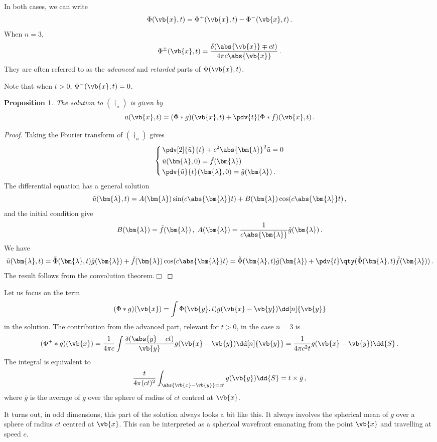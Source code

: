 \documentclass{article}
\theoremstyle{plain}\theoremheaderfont{\normalfont\itshape}\theorembodyfont{\rmfamily}\theoremseparator{.}\newtheorem*{rem}{Remark}\newtheorem*{ex}{Example}\newtheorem*{proof}{Proof}\newtheorem*{altp}{Alternative proof}
\theoremstyle{plain}\theoremheaderfont{\normalfont\bfseries}\theorembodyfont{\rmfamily}\theoremseparator{.}\newtheorem{thm}{Theorem}[section]\newtheorem{lem}[thm]{Lemma}\newtheorem{prop}[thm]{Proposition}\newtheorem*{cor}{Corollary}\newtheorem{defn}[thm]{Definition}\newtheorem{clm}[thm]{Claim}\newtheorem{clminproof}{Claim}
\theoremstyle{break}\theoremheaderfont{\normalfont\itshape}\theorembodyfont{\rmfamily}\theoremseparator{.\medskip}\newtheorem*{proofskip}{Proof}\newtheorem*{exs}{Examples}\newtheorem*{rems}{Remarks}
\theoremstyle{break}\theoremheaderfont{\normalfont\bfseries}\theorembodyfont{\rmfamily}\theoremseparator{.\medskip}\newtheorem{lemskip}[thm]{Lemma}\newtheorem{defnskip}[thm]{Definition}\newtheorem{propskip}[thm]{Proposition}\newtheorem{thmskip}[thm]{Theorem}
\numberwithin{equation}{section}
\newcommand{\qed}{\hfill\ensuremath{\Box}}
\newcommand{\bl}{\bm{\lambda}}
\begin{document}
	In both cases, we can write
	\[\Phi(\vb{x},t)=\Phi^+(\vb{x},t)-\Phi^-(\vb{x},t)\,.\]
	When \(n=3\),
	\[\Phi^\pm(\vb{x},t)=\frac{\delta(\abs{\vb{x}}\mp ct)}{4\pi c\abs{\vb{x}}}\,.\]
	They are often referred to as the \textit{advanced} and \textit{retarded} parts of \(\Phi(\vb{x},t)\). 

	Note that when \(t>0\), \(\Phi^-(\vb{x},t)=0\).
	
	\begin{prop}
		The solution to \((\dagger_a)\) is given by
		\[u(\vb{x},t)=(\Phi*g)(\vb{x},t)+\pdv{t}(\Phi*f)(\vb{x},t)\,.\]
	\end{prop}
	\begin{proof}
		Taking the Fourier transform of \((\dagger_a)\) gives
		\[\left\{\begin{aligned}
			&\,\pdv[2]{\tilde{u}}{t}+c^2\abs{\bl}^2\tilde{u}=0\\
			&\,\tilde{u}(\bl,0)=\tilde{f}(\bl)\\
			&\,\pdv{\tilde{u}}{t}(\bl,0)=\tilde{g}(\bl)\,.
		\end{aligned}\right.\]
		The differential equation has a general solution
		\[\tilde{u}(\bl,t)=A(\bl)\sin(c\abs{\bl}t)+B(\bl)\cos(c\abs{\bl}t)\,,\]
		and the initial condition give
		\[B(\bl)=\tilde{f}(\bl)\,,\;A(\bl)=\frac{1}{c\abs{\bl}}\tilde{g}(\bl)\,.\]
		We have
		\[\tilde{u}(\bl,t)=\tilde{\Phi}(\bl,t)\tilde{g}(\bl)+\tilde{f}(\bl)\cos(c\abs{\bl}t)=\tilde{\Phi}(\bl,t)\tilde{g}(\bl)+\pdv{t}\qty(\tilde{\Phi}(\bl,t)\tilde{f}(\bl))\,.\]
		The result follows from the convolution theorem.\qed
	\end{proof}

	Let us focus on the term
	\[(\Phi*g)(\vb{x})=\int\Phi(\vb{y},t)g(\vb{x}-\vb{y})\dd[n]{\vb{y}}\]
	in the solution. The contribution from the advanced part, relevant for \(t>0\), in the case \(n=3\) is
	\[(\Phi^+*g)(\vb{x})=\frac{1}{4\pi c}\int\frac{\delta(\abs{y}-ct)}{\vb{y}}g(\vb{x}-\vb{y})\dd[n]{\vb{y}}=\frac{1}{4\pi c^2t}g(\vb{x}-\vb{y})\dd{S}\,.\]
	The integral is equivalent to
	\[\frac{t}{4\pi(ct)^2}\int_{\abs{\vb{x}-\vb{y}}=ct}g(\vb{y})\dd{S}=t\times\bar{g}\,,\]
	where \(\bar{g}\) is the average of \(g\) over the sphere of radius of \(ct\) centred at \(\vb{x}\).

	It turns out, in odd dimensions, this part of the solution always looks a bit like this. It always involves the spherical mean of \(g\) over a sphere of radius \(ct\) centred at \(\vb{x}\). This can be interpreted as a spherical wavefront emanating from the point \(\vb{x}\) and travelling at speed \(c\).
\end{document}
